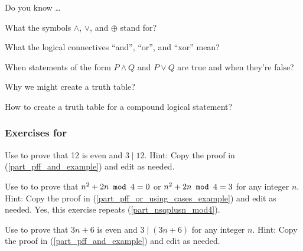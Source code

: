 \begin{exer}[\exerR] %
\label{exer_dyk_and_or}
    Do you know \ldots
        \begin{exerpart}
            \item What the symbols $\land$, $\lor$, and $\oplus$ stand for?
            \item What the logical connectives ``and'', ``or'', and ``xor'' mean? 
            \item When statements of the form $P \land Q$ and $P \lor Q$ are true and when they're false?
            \item Why we might create a truth table?
            \item How to create a truth table for a compound logical statement? 
        \end{exerpart}
\end{exer}


\subsubsection*{Exercises for  \subpffandor}

\begin{exer}[\exerP] %
\label{exer_prove_odd_and_mult3}
    Use  to prove that 12 is even and $3 \mid 12$. Hint: Copy the proof in   (\ref{part_pff_and_example}) and edit as needed.   
\end{exer}

\begin{exer}[\exerP] %
\label{exer_prove_nsqplusn_mod4}
    Use  to to prove that $n^2+2n \texttt{ mod } 4 = 0$ or $n^2+2n \texttt{ mod } 4 = 3$ for any integer $n$.  Hint: Copy the proof in  (\ref{part_pff_or_using_cases_example}) and edit as needed.  Yes, this exercise repeats  (\ref{part_nsqplusn_mod4}).
\end{exer} 

\begin{exer}[\exerU] %
\label{exer_prove_odd_and_mult3_general}
    Use  to prove that $3n+6$ is even and $3 \mid (3n+6)$ for any integer $n$. Hint: Copy the proof in   (\ref{part_pff_and_example}) and edit as needed.    
\end{exer}

